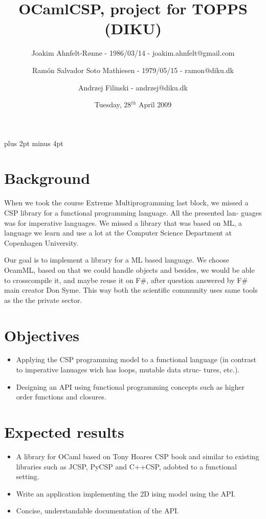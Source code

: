 \documentclass[a4paper,12pt]{article}
\title{OCamlCSP, project for TOPPS (DIKU)}
\author{Joakim Ahnfelt-Rønne - 1986/03/14 - joakim.ahnfelt@gmail.com \and 
        Ramón Salvador Soto Mathiesen - 1979/05/15 - ramon@diku.dk \and
        Andrzej Filinski - andrzej@diku.dk}
\date{Tuesday, 28$^{th}$ April 2009}
\begin{document}
\parindent=0pt
\parskip=8pt plus 2pt minus 4pt

\maketitle
\newpage

\section*{Background}
When we took the course Extreme Multiprogramming last block, we missed 
a CSP library for a functional programming language. All the presented lan- 
guages was for imperative languages. We missed a library that was based on 
ML, a language we learn and use a lot at the Computer Science Department 
at Copenhagen University.

Our goal is to implement a library for a ML based language. We choose 
OcamML, based on that we could handle objects and besides, we would be 
able to crosscompile it, and maybe reuse it on F\#, after question answered 
by F\# main creator Don Syme. This way both the scientific community uses 
same tools as the the private sector. 

\section*{Objectives}
\begin{itemize}
 \item Applying the CSP programming model to a functional language (in 
   contrast to imperative lanuages wich has loops, mutable data struc- 
   tures, etc.).
 \item Designing an API using functional programming concepts such as higher 
   order functions and closures.
\end{itemize}
 
\section*{Expected results}
\begin{itemize}
 \item A library for OCaml based on Tony Hoares CSP book and similar to 
   existing libraries such as JCSP, PyCSP and C++CSP, adobted to a 
   functional setting. 
 \item Write an application implementing the 2D ising model using the API.
 \item Concise, understandable documentation of the API.
\end{itemize}
\end{document}
